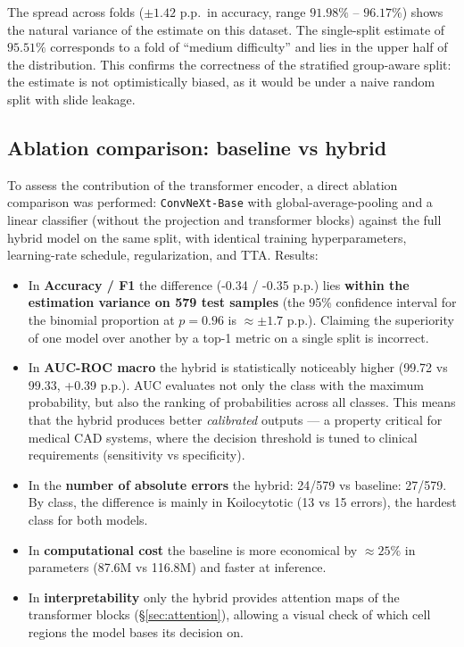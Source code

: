 \documentclass[14pt,a4paper]{extreport}
\begin{document}
The spread across folds ($\pm 1.42$ p.p.\ in accuracy, range
$91.98\%$ -- $96.17\%$) shows the natural variance of the estimate on
this dataset. The single-split estimate of $95.51\%$ corresponds to a
fold of ``medium difficulty'' and lies in the upper half of the
distribution. This confirms the correctness of the stratified
group-aware split: the estimate is not optimistically biased, as it
would be under a naive random split with slide leakage.

\subsection{Ablation comparison: baseline vs hybrid}
\label{sec:ablation}

To assess the contribution of the transformer encoder, a direct ablation
comparison was performed: \texttt{ConvNeXt-Base} with global-average-pooling
and a linear classifier (without the projection and transformer blocks)
against the full hybrid model on the same split, with identical training
hyperparameters, learning-rate schedule, regularization, and TTA.
Results:

\begin{itemize}
    \item In \textbf{Accuracy / F1} the difference (-0.34 / -0.35 p.p.)
          lies \textbf{within the estimation variance on 579 test
          samples} (the 95\% confidence interval for the binomial
          proportion at $p=0.96$ is $\approx \pm 1.7$ p.p.). Claiming
          the superiority of one model over another by a top-1 metric on
          a single split is incorrect.
    \item In \textbf{AUC-ROC macro} the hybrid is statistically
          noticeably higher (99.72 vs 99.33, +0.39 p.p.). AUC evaluates
          not only the class with the maximum probability, but also the
          ranking of probabilities across all classes. This means that
          the hybrid produces better \textit{calibrated} outputs --- a
          property critical for medical CAD systems, where the decision
          threshold is tuned to clinical requirements (sensitivity vs
          specificity).
    \item In the \textbf{number of absolute errors} the hybrid: 24/579
          vs baseline: 27/579. By class, the difference is mainly in
          Koilocytotic (13 vs 15 errors), the hardest class for both
          models.
    \item In \textbf{computational cost} the baseline is more economical
          by $\approx 25\%$ in parameters (87.6M vs 116.8M) and faster
          at inference.
    \item In \textbf{interpretability} only the hybrid provides
          attention maps of the transformer blocks
          (\S\ref{sec:attention}), allowing a visual check of which cell
          regions the model bases its decision on.
\end{itemize}
\end{document}
